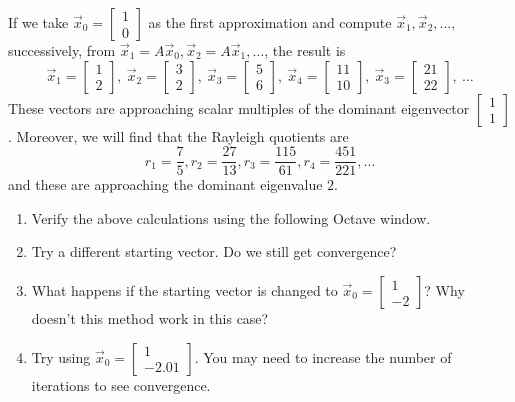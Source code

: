 \documentclass{ximera}
\begin{document}
\begin{exploration}
If we take $\vec{x}_{0} = \left[ \begin{array}{rr}
  1 \\
  0
  \end{array}\right]$ as the first approximation and compute $\vec{x}_{1}, \vec{x}_{2}, \dots,$ successively, from $\vec{x}_{1} = A\vec{x}_{0}, \vec{x}_{2} = A\vec{x}_{1}, \dots$, the result is
\begin{equation*}
\vec{x}_{1} = \left[ \begin{array}{rr}
1 \\
2
\end{array}\right], \
\vec{x}_{2} = \left[ \begin{array}{rr}
3 \\
2
\end{array}\right], \
\vec{x}_{3} = \left[ \begin{array}{rr}
5 \\
6
\end{array}\right], \
\vec{x}_{4} = \left[ \begin{array}{rr}
11 \\
10
\end{array}\right], \
\vec{x}_{3} = \left[ \begin{array}{rr}
21 \\
22
\end{array}\right], \ \dots
\end{equation*}
These vectors are approaching scalar multiples of the dominant eigenvector $\left[ \begin{array}{rr}
1 \\
1
\end{array}\right]$. Moreover, we will find that the Rayleigh quotients are
\begin{equation*}
r_{1} = \frac{7}{5}, r_{2} = \frac{27}{13}, r_{3} = \frac{115}{61}, r_{4} = \frac{451}{221}, \dots
\end{equation*}
and these are approaching the dominant eigenvalue $2$.

\begin{enumerate}
    \item\label{exp:2x2PowerMethod_a} Verify the above calculations using the following Octave window.
    \item\label{exp:2x2PowerMethod_b} Try a different starting vector.  Do we still get convergence?
    \item\label{exp:2x2PowerMethod_c} What happens if the starting vector is changed to $\vec{x}_{0} = \left[ \begin{array}{rr}
  1 \\
  -2
  \end{array}\right]$?  Why doesn't this method work in this case?
  \item\label{exp:2x2PowerMethod_d} Try using $\vec{x}_{0} = \left[ \begin{array}{rr}
  1 \\
  -2.01
  \end{array}\right]$.  You may need to increase the number of iterations to see convergence.
\end{enumerate}



\end{exploration}
\end{document}
